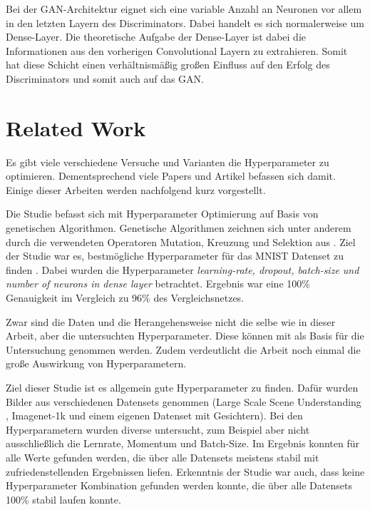 Bei der GAN-Architektur  eignet sich eine variable Anzahl an Neuronen vor allem in den letzten Layern des Discriminators.
Dabei handelt es sich normalerweise um Dense-Layer. 
Die theoretische Aufgabe der Dense-Layer ist dabei die Informationen aus den vorherigen Convolutional Layern zu extrahieren.
Somit hat diese Schicht einen verhältnismäßig großen Einfluss auf den Erfolg des Discriminators und somit auch auf das GAN.


\section{Related Work}
Es gibt viele verschiedene Versuche und Varianten die Hyperparameter zu optimieren.
Dementsprechend viele Papers und Artikel befassen sich damit.
Einige dieser Arbeiten werden nachfolgend kurz vorgestellt.
\newline

Die Studie befasst sich mit Hyperparameter Optimierung auf Basis von genetischen Algorithmen.
Genetische Algorithmen zeichnen sich unter anderem durch die verwendeten Operatoren Mutation, Kreuzung und Selektion aus \cite{genetic-algorithms}.
Ziel der Studie war es, bestmögliche Hyperparameter für das MNIST Datenset zu finden \cite{dataset:mnist}.
Dabei wurden die Hyperparameter \textit{learning-rate, dropout, batch-size und number of neurons in dense layer} betrachtet.
Ergebnis war eine 100\% Genauigkeit im Vergleich zu 96\% des Vergleichsnetzes.
\newline

Zwar sind die Daten und die Herangehensweise nicht die selbe wie in dieser Arbeit, aber die untersuchten Hyperparameter.
Diese können mit als Basis für die Untersuchung genommen werden.
Zudem verdeutlicht die Arbeit noch einmal die große Auswirkung von Hyperparametern.

Ziel dieser Studie ist es allgemein gute Hyperparameter zu finden.
Dafür wurden Bilder aus verschiedenen Datensets genommen (Large Scale Scene Understanding \cite{dataset:lsun}, Imagenet-1k \cite{dataset:image-net} und einem eigenen Datenset mit Gesichtern).
Bei den Hyperparametern wurden diverse untersucht, zum Beispiel aber nicht ausschließlich die Lernrate, Momentum und Batch-Size.
Im Ergebnis konnten für alle Werte gefunden werden, die über alle Datensets meistens stabil mit zufriedenstellenden Ergebnissen liefen.
Erkenntnis der Studie war auch, dass keine Hyperparameter Kombination gefunden werden konnte, die über alle Datensets 100\% stabil laufen konnte.
\newline

